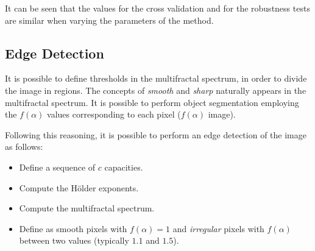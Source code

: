 \documentclass[oneside,a4paper,english,links,12pt]{article}
\begin{document}
It can be seen that the values for the cross validation and for the robustness tests are similar when varying the parameters of the method.

\subsection{Edge Detection}
It is possible to define thresholds in the multifractal spectrum, in order to divide the image in regions. The concepts of {\em smooth} and {\em sharp} naturally appears in the multifractal spectrum. It is possible to perform object segmentation employing the $f(\alpha)$ values corresponding to each pixel ($f(\alpha)$ image).

Following this reasoning, it is possible to perform an edge detection of the image as follows:
\begin{itemize}
\item Define a sequence of $c$ capacities.
\item Compute the H\"older exponents.
\item Compute the multifractal spectrum.
\item Define as smooth pixels with $f(\alpha) = 1$ and {\em irregular} pixels with $f(\alpha)$ between two values (typically $1.1$ and $1.5$).
\end{itemize}
\end{document}
